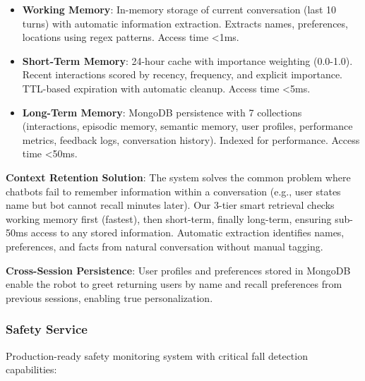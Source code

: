\documentclass[conference]{IEEEtran}
\begin{document}
\begin{itemize}
    \item \textbf{Working Memory}: In-memory storage of current conversation (last 10 turns) with automatic information extraction. Extracts names, preferences, locations using regex patterns. Access time <1ms.
    
    \item \textbf{Short-Term Memory}: 24-hour cache with importance weighting (0.0-1.0). Recent interactions scored by recency, frequency, and explicit importance. TTL-based expiration with automatic cleanup. Access time <5ms.
    
    \item \textbf{Long-Term Memory}: MongoDB persistence with 7 collections (interactions, episodic memory, semantic memory, user profiles, performance metrics, feedback logs, conversation history). Indexed for performance. Access time <50ms.
\end{itemize}

\textbf{Context Retention Solution}: The system solves the common problem where chatbots fail to remember information within a conversation (e.g., user states name but bot cannot recall minutes later). Our 3-tier smart retrieval checks working memory first (fastest), then short-term, finally long-term, ensuring sub-50ms access to any stored information. Automatic extraction identifies names, preferences, and facts from natural conversation without manual tagging.

\textbf{Cross-Session Persistence}: User profiles and preferences stored in MongoDB enable the robot to greet returning users by name and recall preferences from previous sessions, enabling true personalization.

\subsubsection{Safety Service}

Production-ready safety monitoring system with critical fall detection capabilities:
\end{document}
